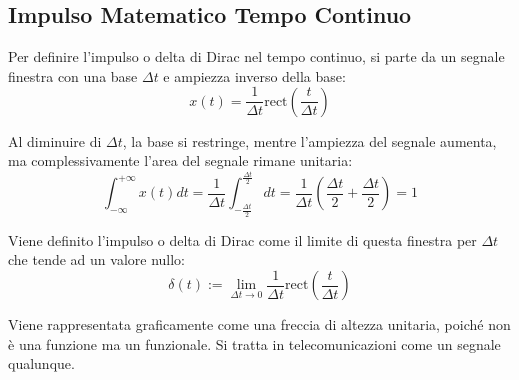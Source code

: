 \documentclass{article}
\numberwithin{equation}{subsection}
\begin{document}
\subsection{Impulso Matematico Tempo Continuo}

Per definire l'impulso o delta di Dirac nel tempo continuo, si parte da un segnale finestra con una base $\Delta t$ e ampiezza inverso della base:
\begin{equation*}
    x(t)=\displaystyle\frac{1}{\Delta t}\mbox{rect}\left(\frac{t}{\Delta t}\right)
\end{equation*}

\begin{center}
\end{center}

Al diminuire di $\Delta t$, la base si restringe, mentre l'ampiezza del segnale aumenta, ma complessivamente l'area del segnale rimane unitaria:
\begin{equation*}
    \displaystyle\int_{-\infty}^{+\infty}x(t)dt=\frac{1}{\Delta t}\int_{-\frac{\Delta t}{2}}^{\frac{\Delta t}{2}}dt=\frac{1}{\Delta t}\left(\frac{\Delta t}{2}+\frac{\Delta t}{2}\right)=1
\end{equation*}

Viene definito l'impulso o delta di Dirac come il limite di questa finestra per $\Delta t$ che tende ad un valore nullo:
\begin{equation*}
    \delta(t):=\lim_{\Delta t\to0}\displaystyle\frac{1}{\Delta t}\mbox{rect}\left(\frac{t}{\Delta t}\right)
\end{equation*}

Viene rappresentata graficamente come una freccia di altezza unitaria, poiché non è una funzione ma un funzionale. Si tratta in telecomunicazioni come un segnale qualunque. 
\begin{center}
\end{center}
\end{document}
